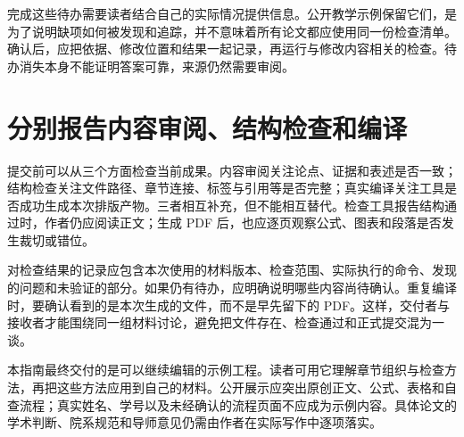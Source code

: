 完成这些待办需要读者结合自己的实际情况提供信息。公开教学示例保留它们，是为了说明缺项如何被发现和追踪，并不意味着所有论文都应使用同一份检查清单。确认后，应把依据、修改位置和结果一起记录，再运行与修改内容相关的检查。待办消失本身不能证明答案可靠，来源仍然需要审阅。

\section{分别报告内容审阅、结构检查和编译}

提交前可以从三个方面检查当前成果。内容审阅关注论点、证据和表述是否一致；结构检查关注文件路径、章节连接、标签与引用等是否完整；真实编译关注工具是否成功生成本次排版产物。三者相互补充，但不能相互替代。检查工具报告结构通过时，作者仍应阅读正文；生成 PDF 后，也应逐页观察公式、图表和段落是否发生裁切或错位。

对检查结果的记录应包含本次使用的材料版本、检查范围、实际执行的命令、发现的问题和未验证的部分。如果仍有待办，应明确说明哪些内容尚待确认。重复编译时，要确认看到的是本次生成的文件，而不是早先留下的 PDF。这样，交付者与接收者才能围绕同一组材料讨论，避免把文件存在、检查通过和正式提交混为一谈。

本指南最终交付的是可以继续编辑的示例工程。读者可用它理解章节组织与检查方法，再把这些方法应用到自己的材料。公开展示应突出原创正文、公式、表格和自查流程；真实姓名、学号以及未经确认的流程页面不应成为示例内容。具体论文的学术判断、院系规范和导师意见仍需由作者在实际写作中逐项落实。
